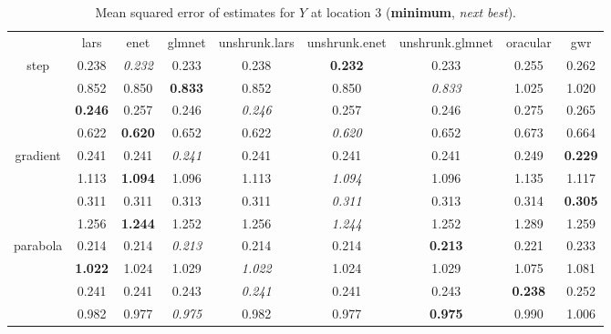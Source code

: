 \documentclass[authoryear, review, 11pt]{elsarticle}
\begin{document}
\begin{table}[ht]
\begin{center}
\begin{tabular}{ccccccccc}
  & lars & enet & glmnet & unshrunk.lars & unshrunk.enet & unshrunk.glmnet & oracular & gwr \\ 
  \cline{2-9}
  \multirow{4}{*}{step} & 0.238 & \emph{0.232} & 0.233 & 0.238 & \textbf{0.232} & 0.233 & 0.255 & 0.262 \\ 
  & 0.852 & 0.850 & \textbf{0.833} & 0.852 & 0.850 & \emph{0.833} & 1.025 & 1.020 \\ 
  & \textbf{0.246} & 0.257 & 0.246 & \emph{0.246} & 0.257 & 0.246 & 0.275 & 0.265 \\ 
  & 0.622 & \textbf{0.620} & 0.652 & 0.622 & \emph{0.620} & 0.652 & 0.673 & 0.664 \\ 
  \cline{2-9}
  \multirow{4}{*}{gradient} & 0.241 & 0.241 & \emph{0.241} & 0.241 & 0.241 & 0.241 & 0.249 & \textbf{0.229} \\ 
  & 1.113 & \textbf{1.094} & 1.096 & 1.113 & \emph{1.094} & 1.096 & 1.135 & 1.117 \\ 
  & 0.311 & 0.311 & 0.313 & 0.311 & \emph{0.311} & 0.313 & 0.314 & \textbf{0.305} \\ 
  & 1.256 & \textbf{1.244} & 1.252 & 1.256 & \emph{1.244} & 1.252 & 1.289 & 1.259 \\ 
  \cline{2-9}
  \multirow{4}{*}{parabola} & 0.214 & 0.214 & \emph{0.213} & 0.214 & 0.214 & \textbf{0.213} & 0.221 & 0.233 \\ 
  & \textbf{1.022} & 1.024 & 1.029 & \emph{1.022} & 1.024 & 1.029 & 1.075 & 1.081 \\ 
  & 0.241 & 0.241 & 0.243 & \emph{0.241} & 0.241 & 0.243 & \textbf{0.238} & 0.252 \\ 
  & 0.982 & 0.977 & \emph{0.975} & 0.982 & 0.977 & \textbf{0.975} & 0.990 & 1.006 \\ 
  \end{tabular}
\caption{Mean squared error of estimates for $Y$ at location 3 (\textbf{minimum}, \emph{next best}).\label{table:loc3-MSEY}}
\end{center}
\end{table}
\end{document}
